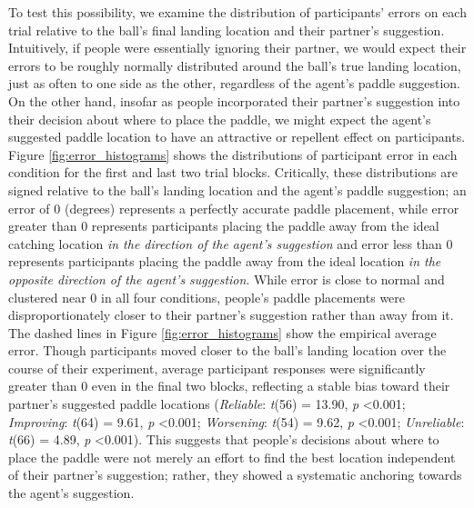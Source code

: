 \documentclass[10pt,letterpaper]{article}
\begin{document}
To test this possibility, we examine the distribution of participants' errors on each trial relative to the ball's final landing location and their partner's suggestion. Intuitively, if people were essentially ignoring their partner, we would expect their errors to be roughly normally distributed around the ball's true landing location, just as often to one side as the other, regardless of the agent's paddle suggestion. On the other hand, insofar as people incorporated their partner's suggestion into their decision about where to place the paddle, we might expect the agent's suggested paddle location to have an attractive or repellent effect on participants. Figure \ref{fig:error_histograms} shows the distributions of participant error in each condition for the first and last two trial blocks. Critically, these distributions are signed relative to the ball's landing location and the agent's paddle suggestion; an error of 0 (degrees) represents a perfectly accurate paddle placement, while error greater than 0 represents participants placing the paddle away from the ideal catching location \textit{in the direction of the agent's suggestion} and error less than 0 represents participants placing the paddle away from the ideal location \textit{in the opposite direction of the agent's suggestion}. While error is close to normal and clustered near 0 in all four conditions, people's paddle placements were disproportionately closer to their partner's suggestion rather than away from it. The dashed lines in Figure \ref{fig:error_histograms} show the empirical average error. Though participants moved closer to the ball's landing location over the course of their experiment, average participant responses were significantly greater than 0 even in the final two blocks, reflecting a stable bias toward their partner's suggested paddle locations (\textit{Reliable}: \textit{t}(56) = 13.90, \textit{p} \textless{0.001}; \textit{Improving}: \textit{t}(64) = 9.61, \textit{p} \textless{0.001}; \textit{Worsening}: \textit{t}(54) = 9.62, \textit{p} \textless{0.001}; \textit{Unreliable}: \textit{t}(66) = 4.89, \textit{p} \textless{0.001}). This suggests that people's decisions about where to place the paddle were not merely an effort to find the best location independent of their partner's suggestion; rather, they showed a systematic anchoring towards the agent's suggestion.
\end{document}

